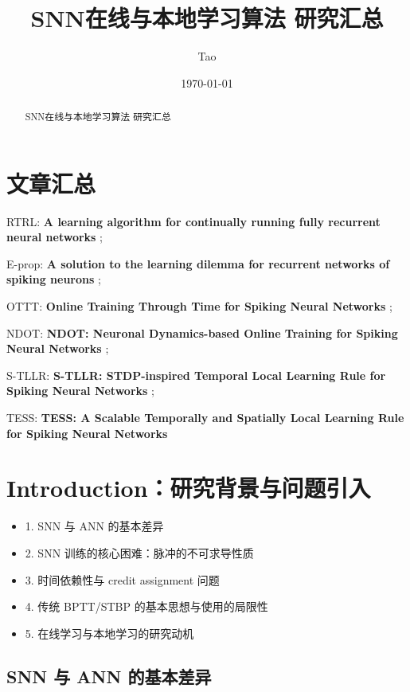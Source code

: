 \documentclass[journal,12pt,onecolumn]{IEEEtran}
\begin{document}
\title{SNN在线与本地学习算法 研究汇总}
\author{Tao}
\date{\today}
\maketitle

\begin{abstract}
SNN在线与本地学习算法 研究汇总
\end{abstract}

\section*{文章汇总}

RTRL: \textbf{A learning algorithm for continually running fully recurrent neural networks} \cite{williams1989learning};

E-prop: \textbf{A solution to the learning dilemma for recurrent networks of spiking neurons} \cite{bellec_solution_2020};

OTTT: \textbf{Online Training Through Time for Spiking Neural Networks} \cite{xiao_online_2022};

NDOT: \textbf{NDOT: Neuronal Dynamics-based Online Training for Spiking Neural Networks} \cite{jiang_ndot_nodate};

S-TLLR: \textbf{S-TLLR: STDP-inspired Temporal Local Learning Rule for Spiking Neural Networks} \cite{apolinario_s-tllr_2024};

TESS: \textbf{TESS: A Scalable Temporally and Spatially Local Learning Rule for Spiking Neural Networks} \cite{apolinario_tess_2025}


\section{Introduction：研究背景与问题引入}

\begin{itemize}
  \item 1. SNN 与 ANN 的基本差异
  \item 2. SNN 训练的核心困难：脉冲的不可求导性质
  \item 3. 时间依赖性与 credit assignment 问题
  \item 4. 传统 BPTT/STBP 的基本思想与使用的局限性
  \item 5. 在线学习与本地学习的研究动机
\end{itemize}

\subsection{SNN 与 ANN 的基本差异}
\end{document}

